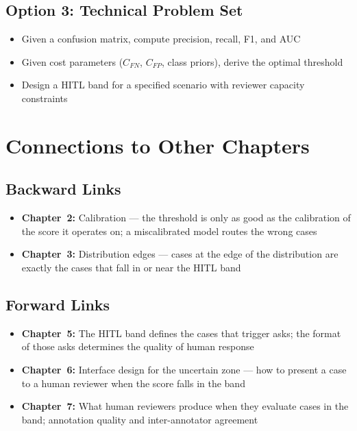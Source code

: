 \subsection{Option 3: Technical Problem Set}

\begin{itemize}
    \item Given a confusion matrix, compute precision, recall, F1, and AUC
    \item Given cost parameters ($C_{FN}$, $C_{FP}$, class priors), derive the optimal threshold
    \item Design a HITL band for a specified scenario with reviewer capacity constraints
\end{itemize}

\section{Connections to Other Chapters}

\subsection{Backward Links}
\begin{itemize}
    \item \textbf{Chapter~2:} Calibration --- the threshold is only as good as the calibration of the score it operates on; a miscalibrated model routes the wrong cases
    \item \textbf{Chapter~3:} Distribution edges --- cases at the edge of the distribution are exactly the cases that fall in or near the HITL band
\end{itemize}

\subsection{Forward Links}
\begin{itemize}
    \item \textbf{Chapter~5:} The HITL band defines the cases that trigger asks; the format of those asks determines the quality of human response
    \item \textbf{Chapter~6:} Interface design for the uncertain zone --- how to present a case to a human reviewer when the score falls in the band
    \item \textbf{Chapter~7:} What human reviewers produce when they evaluate cases in the band; annotation quality and inter-annotator agreement
\end{itemize}

